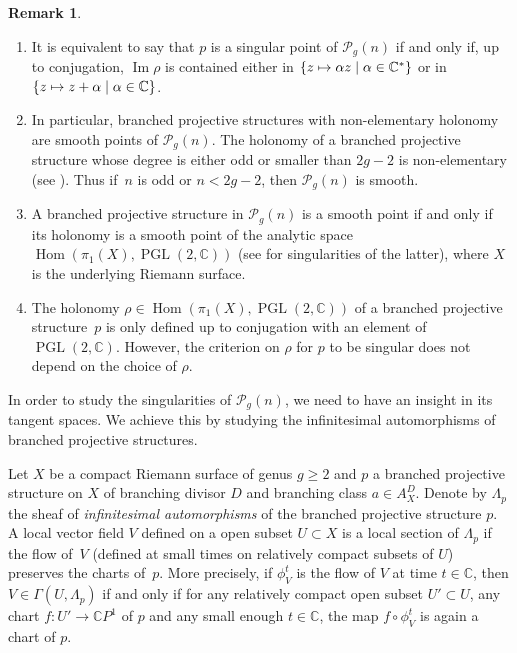 \documentclass[JEP,XML,SOM,Unicode,NoEqCountersInSection,published]{cedram}
\newcommand\mto{\mathchoice{\longmapsto}{\mapsto}{\mapsto}{\mapsto}}
\newcommand{\C}{\mathbb C}
\newcommand{\CP}{\mathbb CP}
\DeclareMathOperator{\Hom}{Hom}
\DeclareMathOperator{\Image}{Im}
\DeclareMathOperator{\PGL}{PGL}
\theoremstyle{definition}
\newtheorem{remark}[definition]{Remark}
\theoremstyle{plain}
\begin{document}
\skpt
\begin{remark}
\begin{enumerate}
\item
It is equivalent to say that $p$ is a singular point of $\mathcal P_g(n)$ if and only if, up to conjugation, $\Image \rho$ is contained either in $\{z \mto \alpha z\mid \alpha \in \C^*\}$ or in $\{z \mto z + \alpha\mid \alpha \in \C\}$.
\item
In particular, branched projective structures with non-elementary holonomy are smooth points of $\mathcal P_g(n)$.
The holonomy of a branched projective structure whose degree is either odd or smaller than $2g-2$ is non-elementary (see \cite{gallo-kapovich-marden}).
Thus if~$n$ is odd or $n < 2g-2$, then $\mathcal P_g(n)$ is smooth.
\item
A branched projective structure in $\mathcal P_g(n)$ is a smooth point if and only if its holonomy is a smooth point of the analytic space $\Hom(\pi_1(X), \PGL(2, \C))$ (see \cite{hubbard} for singularities of the latter), where $X$ is the underlying Riemann surface.
\item
The holonomy $\rho \in \Hom(\pi_1(X), \PGL(2, \C))$ of a branched projective structure~$p$ is only defined up to conjugation with an element of $\PGL(2, \C)$.
However, the criterion on $\rho$ for $p$ to be singular does not depend on the choice of $\rho$.
\end{enumerate}
\end{remark}

In order to study the singularities of $\mathcal P_g(n)$, we need to have an insight in its tangent spaces.
We achieve this by studying the infinitesimal automorphisms of branched projective structures.

\label{subsection_infinitesimal_automorphisms}

Let $X$ be a compact Riemann surface of genus $g \ge 2$ and $p$ a branched projective structure on $X$ of branching divisor $D$ and branching class $a \in A_X^D$.
Denote by $\Lambda_p$ the sheaf of \emph{infinitesimal automorphisms} of the branched projective structure $p$.
A local vector field $V$ defined on a open subset $U \subset X$ is a local section of $\Lambda_p$ if the flow of~$V$ (defined at small times on relatively compact subsets of $U$) preserves the charts of~$p$.
More precisely, if $\phi_V^t$ is the flow of $V$ at time $t \in \C$, then $V \in \Gamma\left(U, \Lambda_p\right)$ if and only if for any relatively compact open subset $U' \subset U$, any chart $f: U' \to \CP^1$ of $p$ and any small enough $t \in \C$, the map $f \circ \phi_V^t$ is again a chart of $p$.
\end{document}
